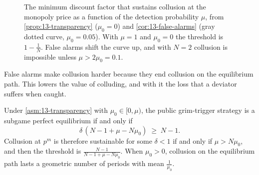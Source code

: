\begin{figure}[htbp]
\centering
{}
\caption{The minimum discount factor that sustains collusion at the monopoly price as a function of the
detection probability $\mu$, from \cref{prop:13-transparency} ($\mu_0 = 0$) and \cref{cor:13-false-alarms}
(gray dotted curve, $\mu_0 = 0.05$). With $\mu = 1$ and $\mu_0 = 0$ the threshold is $1 - \frac{1}{N}$.
False alarms shift the curve up, and with $N = 2$ collusion is impossible unless $\mu > 2\mu_0 = 0.1$.}
\label{fig:13-transparency}
\end{figure}

False alarms make collusion harder because they end collusion on the equilibrium path. This lowers the value of
colluding, and with it the loss that a deviator suffers when caught.

\begin{corollary}\label{cor:13-false-alarms}
Under \cref{asm:13-transparency} with $\mu_0 \in [0, \mu)$, the public grim-trigger strategy is a subgame
perfect equilibrium if and only if
\begin{equation}\label{eq:13-false-alarms}
  \delta\,(N - 1 + \mu - N\mu_0) \;\ge\; N - 1 .
\end{equation}
Collusion at $p^m$ is therefore sustainable for some $\delta < 1$ if and only if $\mu > N\mu_0$, and then the
threshold is $\frac{N-1}{N-1+\mu-N\mu_0}$. When $\mu_0 > 0$, collusion on the equilibrium path lasts a geometric
number of periods with mean $\frac{1}{\mu_0}$.
\end{corollary}

